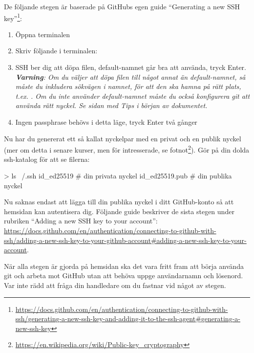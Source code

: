 \begin{Datorarbete}
	\vspace*{3mm}

	\noindent De följande stegen är baserade på GitHubs egen guide ``Generating a new SSH key''\footnote{\url{https://docs.github.com/en/authentication/connecting-to-github-with-ssh/generating-a-new-ssh-key-and-adding-it-to-the-ssh-agent#generating-a-new-ssh-key}}:

	\begin{enumerate}
		\item Öppna terminalen
		\item Skriv följande i terminalen:\\

		\item SSH ber dig att döpa filen, default-namnet går bra att använda, tryck Enter.\\
		      \emph{\textbf{Varning}: Om du väljer att döpa filen till något annat än default-namnet, så måste du inkludera sökvägen i namnet, för att den ska hamna på rätt plats, t.ex. . Om du inte använder default-namnet måste du också konfigurera git att använda rätt nyckel. Se sidan med \emph{Tips} i början av dokumentet.}
		\item Ingen passphrase behövs i detta läge, tryck Enter två gånger
	\end{enumerate}


	\noindent Nu har du genererat ett så kallat nyckelpar med en privat och en publik nyckel (mer om detta i senare kurser, men för intresserade, se fotnot\footnote{\url{https://en.wikipedia.org/wiki/Public-key_cryptography}}). Gör  på din dolda ssh-katalog för att se filerna:
	\begin{Code}
		> ls ~/.ssh
		id_ed25519         # din privata nyckel
		id_ed25519.pub     # din publika nyckel
	\end{Code}

	Nu saknas endast att lägga till din publika nyckel i ditt GitHub-konto så att hemsidan kan autentisera dig. Följande guide beskriver de sista stegen under rubriken ``Adding a new SSH key to your account'': \url{https://docs.github.com/en/authentication/connecting-to-github-with-ssh/adding-a-new-ssh-key-to-your-github-account#adding-a-new-ssh-key-to-your-account}.

	När alla stegen är gjorda på hemsidan ska det vara fritt fram att börja använda git och arbeta mot GitHub utan att behöva uppge användarnamn och lösenord. Var inte rädd att fråga din handledare om du fastnar vid något av stegen.


\end{Datorarbete}
